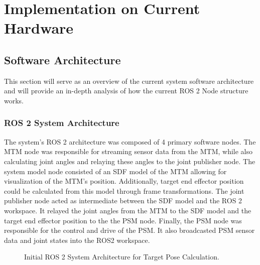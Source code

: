 \chapter{Implementation on Current Hardware}

\section{Software Architecture}

This section will serve as an overview of the current system software architecture and will provide an in-depth analysis of how the current ROS 2 Node structure works.

\subsection{ROS 2 System Architecture}

The system's ROS 2 architecture was composed of 4 primary software nodes. The MTM node was responsible for streaming sensor data from the MTM, while also calculating joint angles and relaying these angles to the joint publisher node. The system model node consisted of an SDF model of the MTM allowing for visualization of the MTM's position. Additionally, target end effector position could be calculated from this model through frame transformations. The joint publisher node acted as intermediate between the SDF model and the ROS 2 workspace. It relayed the joint angles from the MTM to the SDF model and the target end effector position to the the PSM node. Finally, the PSM node was responsible for the control and drive of the PSM. It also broadcasted PSM sensor data and joint states into the ROS2 workspace.

\begin{figure}[h!]
    \centering
    \caption{Initial ROS 2 System Architecture for Target Pose Calculation.}
    \label{fig:initial_architecture}
\end{figure}


